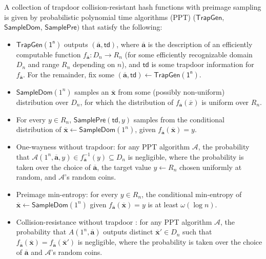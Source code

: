 \documentclass[runningheads]{llncs}
\begin{document}
\begin{definition} 

A collection of trapdoor collision-resistant hash functions
with preimage sampling is given by probabilistic polynomial time algorithms (PPT) ($\mathsf{TrapGen}$, $\mathsf{SampleDom}$, $\mathsf{SamplePre})$ that satisfy the following:
\begin{itemize}
\item $\mathsf{TrapGen(1^n)}$ outputs $(\overline{\mathbf{a}}, \mathsf{td})$, where $\overline{\mathbf{a}}$ is the description of an efficiently computable function $f_{\overline{\mathbf{a}}} : D_n \rightarrow R_n$ (for some efficiently recognizable domain $D_n$ and range $R_n$ depending on $n$), and $\mathsf{td}$ is some trapdoor information for $f_{\overline{\mathbf{a}}}$.
For the remainder, fix some $(\overline{\mathbf{a}}, \mathsf{td}) \leftarrow \mathsf{TrapGen(1^n)}$.

\item $\mathsf{SampleDom}(1^n)$ samples an $\overline{\mathbf{x}}$ from some (possibly non-uniform) distribution over $D_n$, for which the distribution of $f_{\overline{\mathbf{a}}}(\overline{x})$ is uniform over $R_n$.
\item For every $y\in R_n$,
$\mathsf{SamplePre}(\mathsf{td},y)$ samples from the conditional distribution of $\overline{\mathbf{x}} \leftarrow \mathsf{SampleDom}(1^n)$, given $f_{\overline{\mathbf{a}}}(\overline{\mathbf{x}}) = y$.
\item One-wayness without trapdoor:  for any PPT algorithm $\mathcal{A}$, the probability that
$\mathcal{A}(1^n, \overline{\mathbf{a}}, y) \in f^{-1}_{\overline{\mathbf{a}}}
(y) \subseteq D_n $ is negligible, where the probability is taken over the choice of $\overline{\mathbf{a}}$, the
target value $y \leftarrow R_n$ chosen uniformly at random, and $\mathcal{A}$’s random coins. 
\item Preimage min-entropy: for every $y\in R_n$, the conditional min-entropy of $\overline{\mathbf{x}} \leftarrow \mathsf{SampleDom}(1^n)$ given $f_{\overline{\mathbf{a}}}(\overline{\mathbf{x}}) = y$ is at least $\omega(\log n)$.
\item Collision-resistance without trapdoor : for any PPT algorithm $\mathcal{A}$, the probability that
$A(1^n, \overline{\mathbf{a}})$ outputs distinct $\overline{\mathbf{x}}' \in D_n$ such that $f_{\overline{\mathbf{a}}}(\overline{\mathbf{x}}) =
f_{\overline{\mathbf{a}}}(\overline{\mathbf{x}}')$ is negligible, where the probability is taken over
the choice of $\overline{\mathbf{a}}$ and $\mathcal{A}$’s random coins.
\end{itemize}
\end{definition}
\end{document}
